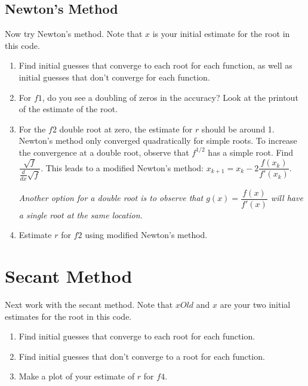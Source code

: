 \documentclass[12pt,letterpaper,noanswers]{exam}
\begin{document}
\subsection*{Newton's Method}

\noindent
Now try Newton's method.  Note that $x$ is your initial estimate for the root in this code.

\begin{enumerate}[resume=classQ]
\item Find initial guesses that converge to each root for each function, as well as initial guesses that don't converge for each function.

\vfill

\item For $f1$, do you see a doubling of zeros in the accuracy? Look at the printout of the estimate of the root.

\vfill

\pagebreak
\item For the $f2$ double root at zero, the estimate for $r$ should be around 1.  Newton's method only converged quadratically for simple roots.  To increase the convergence at a double root, observe that $f^{1/2}$ has a simple root.  Find $\dfrac{\sqrt{f}}{\frac{d}{dx}\sqrt{f}}$.  This leads to a modified Newton's method: $x_{k+1} = x_k - 2\dfrac{f(x_k)}{f'(x_k)}$.  

\emph{Another option for a double root is to observe that $g(x) = \dfrac{f(x)}{f'(x)}$ will have a single root at the same location.}

\vfill

\item Estimate $r$ for $f2$ using modified Newton's method.


\end{enumerate}








\section*{Secant Method}

\noindent
Next work with the secant method.  Note that $xOld$ and $x$ are your two initial estimates for the root in this code.

\begin{enumerate}[resume=classQ]
\item Find initial guesses that converge to each root for each function.

\vfill

\item Find initial guesses that don't converge to a root for each function.

\vfill

\item Make a plot of your estimate of $r$ for $f4$.

\vfill

\end{enumerate}
\end{document}
